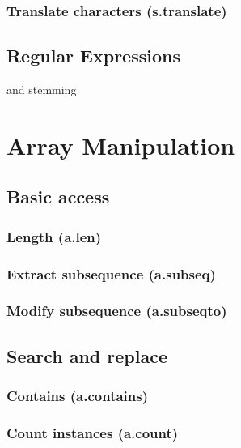 \documentclass{article}
\theoremstyle{definition}
\begin{document}
\subsubsection{Translate characters (s.translate)}

\subsection{Regular Expressions}

and stemming

\pagebreak

\section{Array Manipulation}

\subsection{Basic access}

\subsubsection{Length (a.len)}

\subsubsection{Extract subsequence (a.subseq)}

\subsubsection{Modify subsequence (a.subseqto)}

\subsection{Search and replace}

\subsubsection{Contains (a.contains)}

\subsubsection{Count instances (a.count)}
\end{document}
